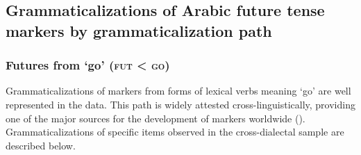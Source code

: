 \documentclass[output=paper]{langsci/langscibook}
\begin{document}
\subsection{Grammaticalizations of Arabic future tense markers by grammaticalization path}\label{sec:fut}
\subsubsection{ Futures from ‘go’ (\textsc{fut} < \textsc{go})}

Grammaticalizations of   markers from forms of lexical verbs meaning ‘go’ are well represented in the  data. This  path is widely attested cross-linguistically, providing one of the major sources for the development of   markers worldwide (\citealt{Bybee1994,HeineKuteva2002}). Grammaticalizations of specific items observed in the cross-dialectal  sample are described below.
\end{document}
